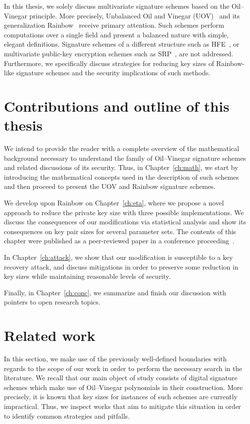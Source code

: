 \documentclass[12pt, a4paper, oneside]{memoir}
\theoremstyle{definition}
\begin{document}
In this thesis, we solely discuss multivariate signature schemes based on the Oil--Vinegar principle. More precisely, Unbalanced Oil and Vinegar (UOV)~\cite{Kipnis:199904} and its generalization Rainbow~\cite{Ding:200506} receive primary attention. Such schemes perform computations over a single field and present a balanced nature with simple, elegant definitions. Signature schemes of a different structure such as HFE~\cite{Patarin:199605}, or multivariate public-key encryption schemes such as SRP~\cite{Duong:201607}, are not addressed. Furthermore, we specifically discuss strategies for reducing key sizes of Rainbow-like signature schemes and the security implications of such methods.

\section{Contributions and outline of this thesis}

We intend to provide the reader with a complete overview of the mathematical background necessary to understand the family of Oil--Vinegar signature schemes and related discussions of its security. Thus, in Chapter~\ref{ch:math}, we start by introducing the mathematical concepts used in the description of such schemes and then proceed to present the UOV and Rainbow signature schemes. 

We develop upon Rainbow on Chapter~\ref{ch:eta}, where we propose a novel approach to reduce the private key size with three possible implementations. We discuss the consequences of our modifications via statistical analysis and show its consequences on key pair sizes for several parameter sets. The contents of this chapter were published as a peer-reviewed paper in a conference proceeding~\cite{Zambonin:201907}. 

In Chapter~\ref{ch:attack}, we show that our modification is susceptible to a key recovery attack, and discuss mitigations in order to preserve some reduction in key sizes while maintaining reasonable levels of security. 

Finally, in Chapter~\ref{ch:conc}, we summarize and finish our discussion with pointers to open research topics.

\section{Related work}\label{sec:related}

In this section, we make use of the previously well-defined boundaries with regards to the scope of our work in order to perform the necessary search in the literature. We recall that our main object of study consists of digital signature schemes which make use of Oil--Vinegar polynomials in their construction. More precisely, it is known that key sizes for instances of such schemes are currently impractical. Thus, we inspect works that aim to mitigate this situation in order to identify common strategies and pitfalls.
\end{document}
